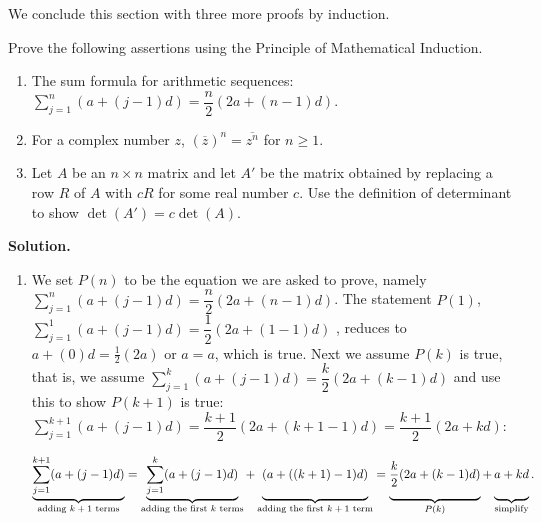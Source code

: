 \documentclass{ximera}
\begin{document}
\smallskip

We conclude this section with three more proofs by induction.

\newpage


\begin{example} \label{inductionex02} Prove the following assertions using the Principle of Mathematical Induction.

\begin{enumerate}

\item  The sum formula for arithmetic sequences: $\displaystyle{\sum_{j=1}^{n} (a + (j-1)d) = \dfrac{n}{2}(2a + (n-1)d)}$.

\item  For a complex number $z$, $\left(\overline{z}\right)^n = \overline{z^{n}}$ for $n \geq 1$.

\item  Let $A$ be an $n \times n$ matrix and let $A'$ be the matrix obtained by replacing a row $R$ of $A$ with $cR$ for some real number $c$.  Use the definition of determinant to show $\det(A') = c \det(A)$.


\end{enumerate}

{\bf Solution.}

\begin{enumerate}

\item We set $P(n)$ to be the equation we are asked to prove, namely  $\displaystyle{\sum_{j=1}^{n} (a + (j-1)d) = \dfrac{n}{2}(2a + (n-1)d)}$.  The statement $P(1)$,  $\displaystyle{\sum_{j=1}^{1} (a + (j-1)d) = \dfrac{1}{2}(2a + (1-1)d)}$ ,  reduces to  $a+(0)d = \frac{1}{2} (2a)$ or $a = a$, which is true.  Next we assume $P(k)$ is true, that is, we assume $\displaystyle{\sum_{j=1}^{k} (a + (j-1)d)  = \dfrac{k}{2}(2a + (k-1)d)}$ and use this to  show $P(k+1)$ is true: $\displaystyle{\sum_{j=1}^{k+1} (a + (j-1)d)  =  \dfrac{k+1}{2}(2a + (k+1-1)d) = \dfrac{k+1}{2}(2a + kd)}$:

\[ \underbrace{\displaystyle{\sum_{j=1}^{k+1} (a + (j-1)d)}}_{\text{adding $k+1$ terms}}  = \underbrace{\displaystyle{\sum_{j=1}^{k} (a + (j-1)d)}}_{\text{adding the first $k$ terms}} + \underbrace{(a+((k+1)-1)d ) \vphantom{\displaystyle{\sum_{j=1}^{k+1}}} }_{\text{adding the first $k+1$ term}} =  \underbrace{\dfrac{k}{2}(2a + (k-1)d)\vphantom{\displaystyle{\sum_{j=1}^{k+1}}} }_{\text{$P(k)$}} +\underbrace{a+kd \vphantom{\displaystyle{\sum_{j=1}^{k+1}}} }_{\text{simplify}}.\]



\end{enumerate}
\end{example}
\end{document}
